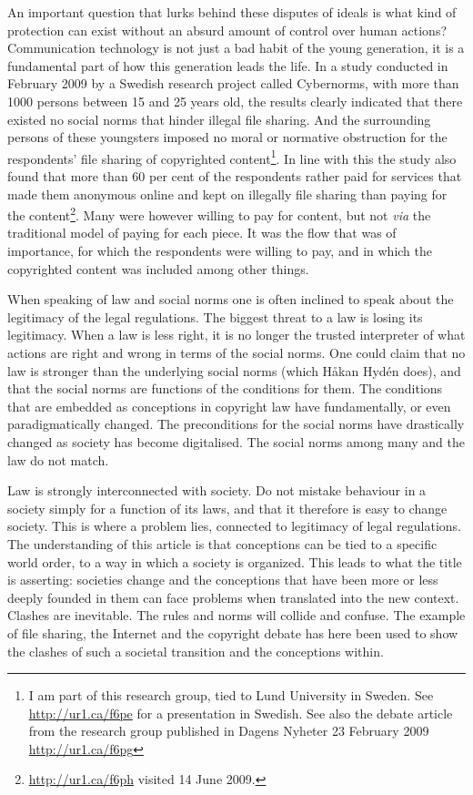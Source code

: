 An important question that lurks behind these disputes of ideals is what kind of
protection can exist without an absurd amount of control over human actions?
Communication technology is not just a bad habit of the young generation, it is
a fundamental part of how this generation leads the life. In a study conducted
in February 2009 by a Swedish research project called Cybernorms, with more than
1000 persons between 15 and 25 years old, the results clearly indicated that
there existed no social norms that hinder illegal f\hbox{}ile sharing. And the
surrounding persons of these youngsters imposed no moral or normative
obstruction for the respondents' f\hbox{}ile sharing of copyrighted
content\footnote{I am part of this research group, tied to Lund University in
Sweden. See \url{http://ur1.ca/f6pe} for a presentation in Swedish. See also the
debate article from the research group published in Dagens Nyheter 23 February
2009 \url{http://ur1.ca/f6pg}}. In line with this the study also found that
more than 60 per cent of the respondents rather paid for services that made them
anonymous online and kept on illegally f\hbox{}ile sharing than paying for the
content\footnote{\url{http://ur1.ca/f6ph} visited 14 June 2009.}. Many were
however willing to pay for content, but not \textit{via} the traditional model
of paying for each piece. It was the f\hbox{}low that was of importance, for
which the respondents were willing to pay, and in which the copyrighted content
was included among other things. 

When speaking of law and social norms one is often inclined to speak about the
legitimacy of the legal regulations. The biggest threat to a law is losing its
legitimacy. When a law is less right, it is no longer the trusted interpreter of
what actions are right and wrong in terms of the social norms. One could claim
that no law is stronger than the underlying social norms (which Håkan
Hydén\cite{darling-hyden02} does), and that the social norms are functions of
the conditions for them. The conditions that are embedded as conceptions in
copyright law have fundamentally, or even paradigmatically changed. The
preconditions for the social norms have drastically changed as society has
become digitalised. The social norms among many and the law do not match.

Law is strongly interconnected with society. Do not mistake behaviour in a
society simply for a function of its laws, and that it therefore is easy to
change society. This is where a problem lies, connected to legitimacy of legal
regulations. The understanding of this article is that conceptions can be tied
to a specif\hbox{}ic world order, to a way in which a society is organized. This leads
to what the title is asserting: societies change and the conceptions that have
been more or less deeply founded in them can face problems when translated into
the new context. Clashes are inevitable. The rules and norms will collide and
confuse. The example of f\hbox{}ile sharing, the Internet and the copyright debate has
here been used to show the clashes of such a societal transition and the
conceptions within. 



